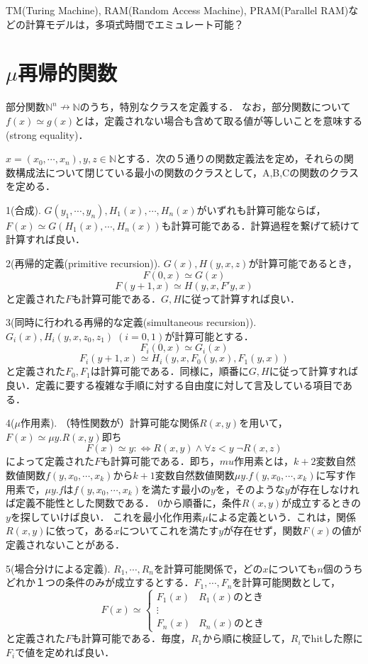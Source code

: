 \documentclass[uplatex, 12pt, dvipdfmx]{jsreport}
\begin{document}
TM(Turing Machine), RAM(Random Access Machine), PRAM(Parallel RAM)などの計算モデルは，多項式時間でエミュレート可能？

\section{$\mu$再帰的関数}
部分関数$\mathbb{N}^n\nrightarrow\mathbb{N}$のうち，特別なクラスを定義する．
なお，部分関数について$f(x)\simeq g(x)$とは，定義されない場合も含めて取る値が等しいことを意味する(strong equality)．

\begin{definition}\label{def-primitive_recursive_function}
    $x=(x_0,\cdots,x_n), y,z\in\mathbb{N}$とする．次の５通りの関数定義法を定め，それらの関数構成法について閉じている最小の関数のクラスとして，A,B,Cの関数のクラスを定める．

    1(合成). $G(y_1,\cdots,y_n), H_1(x), \cdots, H_n(x)$がいずれも計算可能ならば，$F(x)\simeq G(H_1(x),\cdots,H_n(x))$も計算可能である．計算過程を繋げて続けて計算すれば良い．

    2(再帰的定義(primitive recursion)). $G(x),H(y,x,z)$が計算可能であるとき，
    \[ F(0,x)\simeq G(x) \]
    \[ F(y+1,x)\simeq H(y,x,F'y,x) \]
    と定義された$F$も計算可能である．$G,H$に従って計算すれば良い．

    3(同時に行われる再帰的な定義(simultaneous recursion)). $G_i(x),H_i(y,x,z_0,z_1)\;(i=0,1)$が計算可能とする．
    \[ F_i(0,x)\simeq G_i(x) \]
    \[ F_i(y+1,x)\simeq H_i(y,x,F_0(y,x),F_1(y,x)) \]
    と定義された$F_0,F_1$は計算可能である．同様に，順番に$G,H$に従って計算すれば良い．定義に要する複雑な手順に対する自由度に対して言及している項目である．

    4($\mu$作用素). （特性関数が）計算可能な関係$R(x,y)$を用いて，$F(x)\simeq \mu y.R(x,y)$即ち
    \[ F(x)\simeq y:\Leftrightarrow R(x,y)\land\forall z<y\; \lnot R(x,z) \]
    によって定義された$F$も計算可能である．即ち，$mu$作用素とは，$k+2$変数自然数値関数$f(y,x_0,\cdots,x_k)$から$k+1$変数自然数値関数$\mu y.f(y,x_0,\cdots,x_k)$に写す作用素で，$\mu y.f$は$f(y,x_0,\cdots,x_k)$を満たす最小の$y$を，そのような$y$が存在しなければ定義不能性とした関数である．
    $0$から順番に，条件$R(x,y)$が成立するときの$y$を探していけば良い．
    これを最小化作用素$\mu$による定義という．これは，関係$R(x,y)$に依って，ある$x$についてこれを満たす$y$が存在せず，関数$F(x)$の値が定義されないことがある．

    5(場合分けによる定義). $R_1,\cdots,R_n$を計算可能関係で，どの$x$についても$n$個のうちどれか１つの条件のみが成立するとする．$F_1,\cdots,F_n$を計算可能関数として，
    \[ F(x)\simeq\begin{cases}
        F_1(x) & R_1(x)のとき \\
        \vdots & \\
        F_n(x) & R_n(x)のとき
    \end{cases} \]
    と定義された$F$も計算可能である．毎度，$R_1$から順に検証して，$R_i$でhitした際に$F_i$で値を定めれば良い．


\end{definition}
\end{document}
